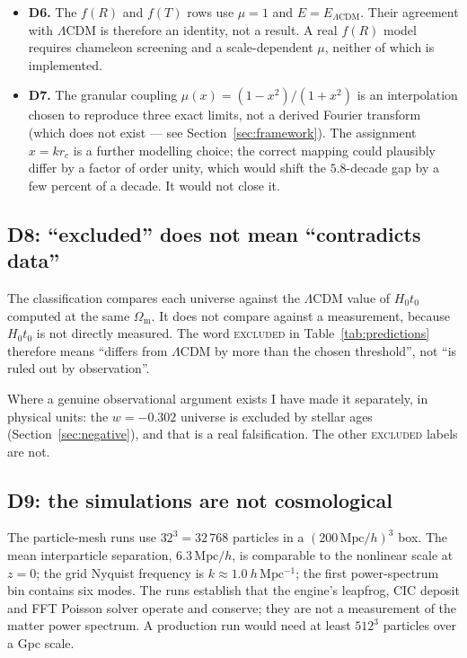 \documentclass[11pt,a4paper]{article}
\theoremstyle{definition}
\newcommand{\Omm}{\Omega_{\mathrm{m}}}
\newcommand{\Hzt}{H_0 t_0}
\newcommand{\Mpc}{\,\mathrm{Mpc}}
\begin{document}
\begin{itemize}
\item \textbf{D6.} The $f(R)$ and $f(T)$ rows use $\mu = 1$ and
$E = E_{\Lambda\mathrm{CDM}}$. Their agreement with $\Lambda$CDM is therefore
an identity, not a result. A real $f(R)$ model requires chameleon screening
and a scale-dependent $\mu$, neither of which is implemented.
\item \textbf{D7.} The granular coupling $\mu(x) = (1-x^2)/(1+x^2)$ is an
interpolation chosen to reproduce three exact limits, not a derived Fourier
transform (which does not exist --- see Section~\ref{sec:framework}). The
assignment $x = k r_c$ is a further modelling choice; the correct mapping
could plausibly differ by a factor of order unity, which would shift the
$5.8$-decade gap by a few percent of a decade. It would not close it.
\end{itemize}

\subsection{D8: ``excluded'' does not mean ``contradicts data''}

The classification compares each universe against the $\Lambda$CDM value of
$\Hzt$ computed at the same $\Omm$. It does not compare against a measurement,
because $\Hzt$ is not directly measured. The word \textsc{excluded} in
Table~\ref{tab:predictions} therefore means ``differs from $\Lambda$CDM by
more than the chosen threshold'', not ``is ruled out by observation''.

Where a genuine observational argument exists I have made it separately, in
physical units: the $w = -0.302$ universe is excluded by stellar ages
(Section~\ref{sec:negative}), and that is a real falsification. The other
\textsc{excluded} labels are not.

\subsection{D9: the simulations are not cosmological}

The particle-mesh runs use $32^3 = 32\,768$ particles in a $(200\Mpc/h)^3$
box. The mean interparticle separation, $6.3\Mpc/h$, is comparable to the
nonlinear scale at $z = 0$; the grid Nyquist frequency is
$k \approx 1.0\ h\,\mathrm{Mpc^{-1}}$; the first power-spectrum bin contains
six modes. The runs establish that the engine's leapfrog, CIC deposit and FFT
Poisson solver operate and conserve; they are not a measurement of the matter
power spectrum. A production run would need at least $512^3$ particles over a
Gpc scale.
\end{document}
